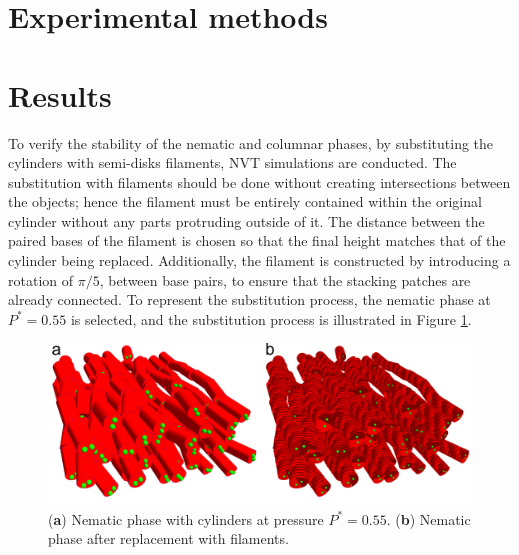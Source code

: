 \documentclass[aip,jcp, amsmath, amssymb, reprint]{revtex4-1}
\begin{document}
\section{\label{exp}Experimental methods}




\section{\label{Results}Results}
To verify the stability of the nematic and columnar phases, by substituting the cylinders with semi-disks filaments, NVT
simulations are conducted. The substitution with filaments should be done without creating intersections between the
objects; hence the filament must be entirely contained within the original cylinder without any parts protruding outside
of it. The distance between the paired bases of the filament is chosen so that the final height matches that of the
cylinder being replaced. Additionally, the filament is constructed by introducing a rotation of $\pi/5$, between base
pairs, to ensure that the stacking patches are already connected. To represent the substitution process, the nematic
phase at $P^*=0.55$ is selected, and the substitution process is illustrated in Figure \ref{sosti1}.

\begin{figure}[h!]
\includegraphics[width=0.9\linewidth]{sosti1.png} 
\caption{\label{sosti1} (\textbf{a}) Nematic phase with cylinders at pressure $P^*=0.55$. (\textbf{b}) Nematic phase after replacement with filaments. } 
\end{figure} 
\end{document}
